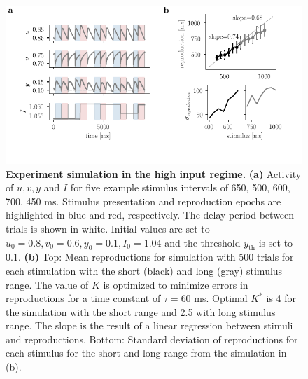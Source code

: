 \documentclass[10pt, a4paper]{article}
\begin{document}
\begin{figure}[ht]
	\centering
	\includegraphics{figures/highI.pdf}
	\caption{\textbf{Experiment simulation in the high input regime.} 
	\textbf{(a)} Activity of $u, v, y$ and $I$ for five example stimulus intervals of 650, 500, 600, 700, 450 ms. Stimulus presentation and reproduction epochs are highlighted in blue and red, respectively. The delay period between trials is shown in white. Initial values are set to $u_0=0.8 , v_0=0.6 , y_0=0.1, I_0=1.04$ and the threshold $y_{\text{th}}$ is set to 0.1. 
	\textbf{(b)} Top: Mean reproductions for simulation with 500 trials for each stimulation with the short (black) and long (gray) stimulus range. The value of $K$ is optimized to minimize errors in reproductions for a time constant of $\tau = 60$ ms. Optimal $K^*$ is 4 for the simulation with the short range and 2.5 with long stimulus range.
		The slope is the result of a linear regression between stimuli and reproductions.
		Bottom: Standard deviation of reproductions for each stimulus for the short and long range from the simulation in (b).
	}
\label{highI}
\end{figure}
\end{document}

